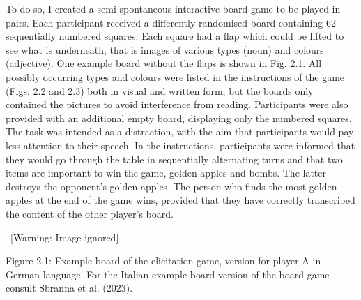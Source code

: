 \begin{styleStandard}
To do so, I created a semi-spontaneous interactive board game to be played in pairs. Each participant received a differently randomised board containing 62 sequentially numbered squares. Each square had a flap which could be lifted to see what is underneath, that is images of various types (noun) and colours (adjective). One example board without the flaps is shown in Fig. 2.1. All possibly occurring types and colours were listed in the instructions of the game (Figs. 2.2 and 2.3) both in visual and written form, but the boards only contained the pictures to avoid interference from reading. Participants were also provided with an additional empty board, displaying only the numbered squares. The task was intended as a distraction, with the aim that participants would pay less attention to their speech. In the instructions, participants were informed that they would go through the table in sequentially alternating turns and that two items are important to win the game, golden apples and bombs. The latter destroys the opponent’s golden apples. The person who finds the most golden apples at the end of the game wins, provided that they have correctly transcribed the content of the other player’s board.
\end{styleStandard}

\begin{styleStandard}
\   [Warning: Image ignored] %
 
\end{styleStandard}

\begin{stylecaption}
Figure 2.1: Example board of the elicitation game, version for player A in German language. For the Italian example board version of the board game consult Sbranna et al. (2023).
\end{stylecaption}

